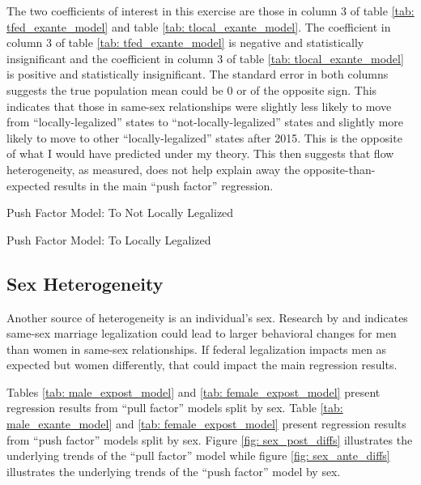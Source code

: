 \documentclass[12pt,letterpaper]{article}
\begin{document}
 The two coefficients of interest in this exercise are those in column 3  of table \ref{tab: tfed_exante_model} and table \ref{tab: tlocal_exante_model}. The coefficient in column 3 of table \ref{tab: tfed_exante_model} is negative and statistically insignificant and the coefficient in column 3 of table \ref{tab: tlocal_exante_model} is positive and statistically insignificant. The standard error in both columns suggests the true population mean could be 0 or of the opposite sign. This indicates that those in same-sex relationships were slightly less likely to move from “locally-legalized” states to “not-locally-legalized” states and slightly more likely to move to other “locally-legalized” states after 2015. This is the opposite of what I would have predicted under my theory. This then suggests that flow heterogeneity, as measured, does not help explain away the opposite-than-expected results in the main “push factor” regression. 

\begin{table}[htbp] %
    \centering
    \caption{Push Factor Model: To Not Locally Legalized}
    \label{tab: tfed_exante_model}
    
\end{table}

\begin{table}[htbp]
    \centering
    \caption{Push Factor Model: To Locally Legalized}
    \label{tab: tlocal_exante_model}
    
\end{table}


\clearpage
\subsection{Sex Heterogeneity}

Another source of heterogeneity is an individual’s sex. Research by \citet{1} and \citet{12} indicates same-sex marriage legalization could lead to larger behavioral changes for men than women in same-sex relationships. If federal legalization impacts men as expected but women differently, that could impact the main regression results.

Tables \ref{tab: male_expost_model} and \ref{tab: female_expost_model} present regression results from “pull factor” models split by sex. Table \ref{tab: male_exante_model} and \ref{tab: female_expost_model} present regression results from “push factor” models split by sex. Figure \ref{fig: sex_post_diffs} illustrates the underlying trends of the “pull factor” model while figure \ref{fig: sex_ante_diffs} illustrates the underlying trends of the “push factor” model by sex.
\end{document}

